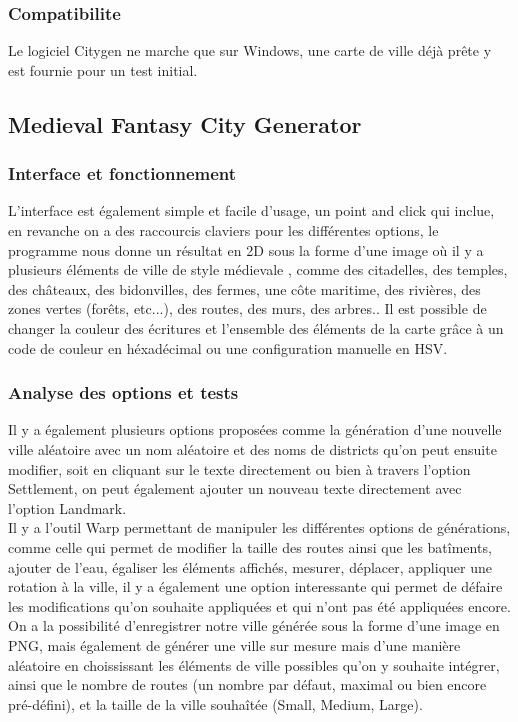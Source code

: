 \subsubsection{Compatibilite}
Le logiciel Citygen ne marche que sur Windows, une carte de ville déjà prête y est fournie pour un test initial.

\subsection{Medieval Fantasy City Generator}
\subsubsection{Interface et fonctionnement}
L'interface est également simple et facile d'usage, un point and click qui inclue, en revanche on a des raccourcis claviers pour les différentes options, le programme nous donne un résultat en 2D sous la forme d'une image où il y a plusieurs éléments de ville de style médievale , comme des citadelles, des temples, des châteaux, des bidonvilles, des fermes, une côte maritime, des rivières, des zones vertes (forêts, etc...), des routes, des murs, des arbres.. Il est possible de changer la couleur des écritures et l'ensemble des éléments de la carte grâce à un code de couleur en héxadécimal ou une configuration manuelle en HSV.

\subsubsection{Analyse des options et tests}

Il y a également plusieurs options proposées comme la génération d'une nouvelle ville aléatoire avec un nom aléatoire et des noms de districts qu'on peut ensuite modifier, soit en cliquant sur le texte directement ou bien à travers l'option Settlement, on peut également ajouter un nouveau texte directement avec l'option Landmark.\\

Il y a l'outil Warp permettant de manipuler les différentes options de générations, comme celle qui permet de modifier la taille des routes ainsi que les batîments, ajouter de l'eau, égaliser les éléments affichés, mesurer, déplacer, appliquer une rotation à la ville, il y a également une option interessante qui permet de défaire les modifications qu'on souhaite appliquées et qui n'ont pas été appliquées encore.\\

On a la possibilité d'enregistrer notre ville générée sous la forme d'une image en PNG, mais également de générer une ville sur mesure mais d'une manière aléatoire en choississant les éléments de ville possibles qu'on y souhaite intégrer, ainsi que le nombre de routes (un nombre par défaut, maximal ou bien encore pré-défini), et la taille de la ville souhaîtée (Small, Medium, Large).\\


